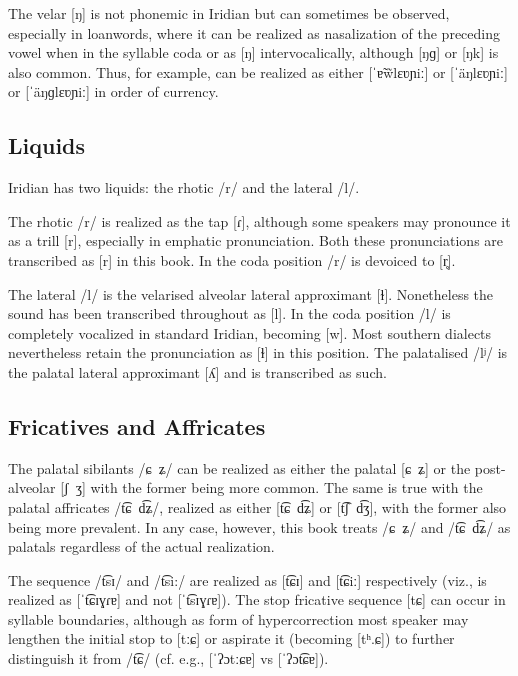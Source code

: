 The velar [ŋ] is not phonemic in Iridian but can sometimes be observed,
especially in loanwords, where it can be realized as nasalization of the
preceding vowel when in the syllable coda or as [ŋ] intervocalically, although
[ŋɡ] or [ŋk] is also common. Thus, for example,  can be
realized as either [ˈɐ̃w̃lɛʋɲiː] or [ˈäŋlɛʋɲiː] or [ˈäŋɡlɛʋɲiː] in order of
currency.

\subsection{Liquids}

Iridian has two liquids: the rhotic /r/ and the lateral /l/.

The rhotic /r/ is realized as the tap [ɾ], although some speakers may pronounce
it as a trill [r], especially in emphatic pronunciation. Both these
pronunciations are transcribed as [r] in this book. In the coda position /r/ is
devoiced to [r̥].

The lateral /l/ is  the velarised alveolar lateral approximant [ɫ]. Nonetheless
the sound has been transcribed throughout as [l]. In the coda position /l/ is
completely vocalized in standard Iridian, becoming [w]. Most southern dialects
nevertheless retain the pronunciation as [ɫ] in this position. The palatalised
/lʲ/ is the palatal lateral approximant [ʎ] and is transcribed as such.

\subsection{Fricatives and Affricates}

The palatal sibilants /ɕ~ʑ/ can be realized as either the palatal [ɕ~ʑ] or the
post-alveolar [ʃ~ʒ] with the former being more common. The same is true with the
palatal affricates /t͡ɕ~d͡ʑ/, realized as either [t͡ɕ~d͡ʑ] or [t͡ʃ~d͡ʒ], with
the former also being more prevalent. In any case, however, this book treats
/ɕ~ʑ/ and /t͡ɕ~d͡ʑ/ as palatals regardless of the actual realization.

The sequence /t͡sɪ/ and /t͡si:/ are realized as [t͡ɕɪ] and [t͡ɕiː] respectively
(viz.,  is realized as [ˈt͡ɕɪɣɾɐ] and not [ˈt͡sɪɣɾɐ]). The
stop fricative sequence [tɕ] can occur in syllable boundaries, although as form
of hypercorrection most speaker may lengthen the initial stop to [tːɕ] or
aspirate it (becoming [tʰ.ɕ]) to further distinguish it from /t͡ɕ/ (cf. e.g.,
 [ˈʔɔtːɕɐ] vs  [ˈʔɔt͡ɕɐ]).

